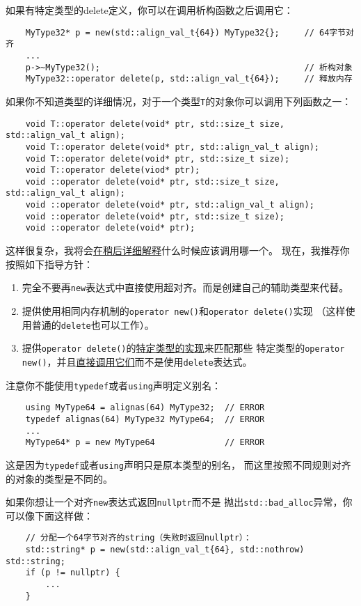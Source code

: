 如果有特定类型的delete定义，你可以在调用析构函数之后调用它：
\begin{lstlisting}
    MyType32* p = new(std::align_val_t{64}) MyType32{};     // 64字节对齐
    ...
    p->~MyType32();                                         // 析构对象
    MyType32::operator delete(p, std::align_val_t{64});     // 释放内存
\end{lstlisting}
如果你不知道类型的详细情况，对于一个类型\texttt{T}的对象你可以调用下列函数之一：
\begin{lstlisting}
    void T::operator delete(void* ptr, std::size_t size, std::align_val_t align);
    void T::operator delete(void* ptr, std::align_val_t align);
    void T::operator delete(void* ptr, std::size_t size);
    void T::operator delete(viod* ptr);
    void ::operator delete(void* ptr, std::size_t size, std::align_val_t align);
    void ::operator delete(void* ptr, std::align_val_t align);
    void ::operator delete(void* ptr, std::size_t size);
    void ::operator delete(void* ptr);
\end{lstlisting}
这样很复杂，我将会\hyperref[ch30.2.2.1]{在稍后详细解释}什么时候应该调用哪一个。
现在，我推荐你按照如下指导方针：
\begin{enumerate}
    \item 完全不要再\texttt{new}表达式中直接使用超对齐。而是创建自己的辅助类型来代替。
    \item 提供使用相同内存机制的\texttt{operator new()}和\texttt{operator delete()}实现
    （这样使用普通的\texttt{delete}也可以工作）。
    \item 提供\texttt{operator delete()}的\hyperref[ch30.2.2]{特定类型的实现}来匹配那些
    特定类型的\texttt{operator new()}，并且\hyperref[类型特定delete]{直接调用它们}而不是使用\texttt{delete}表达式。
\end{enumerate}
注意你不能使用\texttt{typedef}或者\texttt{using}声明定义别名：
\begin{lstlisting}
    using MyType64 = alignas(64) MyType32;  // ERROR
    typedef alignas(64) MyType32 MyType64;  // ERROR
    ...
    MyType64* p = new MyType64              // ERROR
\end{lstlisting}
这是因为\texttt{typedef}或者\texttt{using}声明只是原本类型的别名，
而这里按照不同规则对齐的对象的类型是不同的。

如果你想让一个对齐\texttt{new}表达式返回\texttt{nullptr}而不是
抛出\texttt{std::bad\_alloc}异常，你可以像下面这样做：
\begin{lstlisting}
    // 分配一个64字节对齐的string（失败时返回nullptr）：
    std::string* p = new(std::align_val_t{64}, std::nothrow) std::string;
    if (p != nullptr) {
        ...
    }
\end{lstlisting}

